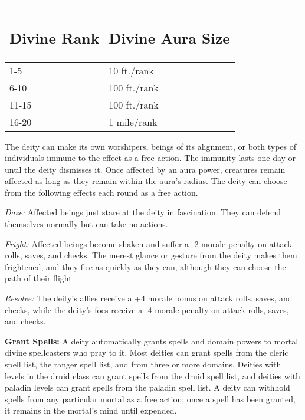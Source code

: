 \documentclass{article}
\begin{document}
\vspace{12pt}
\begin{tabular}{|>{\raggedright}p{52pt}|>{\raggedright}p{71pt}|}
\hline
\subsection*{D\textbf{ivine Rank }} & \subsection*{D\textbf{ivine Aura Size}}\tabularnewline
\hline
1-5  & 10 ft./rank\tabularnewline
\hline
6-10  & 100 ft./rank\tabularnewline
\hline
11-15  & 100 ft./rank\tabularnewline
\hline
16-20  & 1 mile/rank\tabularnewline
\hline
\end{tabular}

\vspace{12pt}
The deity can make its own worshipers, beings of its alignment, or both types of 
individuals immune to the effect as a free action. The immunity lasts one day or 
until the deity dismisses it. Once affected by an aura power, creatures remain 
affected as long as they remain within the aura's radius. The deity can choose 
from the following effects each round as a free action.

\textit{Daze: }Affected beings just stare at the deity in fascination. They can 
defend themselves normally but can take no actions.

\textit{Fright: }Affected beings become shaken and suffer a -2 morale penalty on 
attack rolls, saves, and checks. The merest glance or gesture from the deity makes 
them frightened, and they flee as quickly as they can, although they can choose 
the path of their flight.

\textit{Resolve: }The deity's allies receive a +4 morale bonus on attack rolls, 
saves, and checks, while the deity's foes receive a -4 morale penalty on attack 
rolls, saves, and checks.

\vspace{12pt}
\textbf{Grant Spells: }A deity automatically grants spells and domain powers to 
mortal divine spellcasters who pray to it. Most deities can grant spells from the 
cleric spell list, the ranger spell list, and from three or more domains. Deities 
with levels in the druid class can grant spells from the druid spell list, and 
deities with paladin levels can grant spells from the paladin spell list. A deity 
can withhold spells from any particular mortal as a free action; once a spell has 
been granted, it remains in the mortal's mind until expended.
\end{document}
